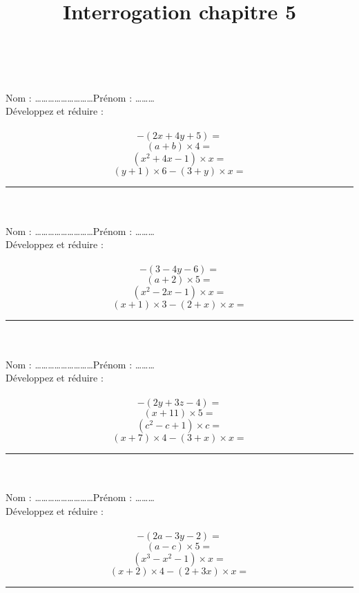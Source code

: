 \documentclass[14 pt]{extarticle}
\title{Interrogation chapitre 5}
\date{}
\theoremstyle{plain}
\begin{document}
 \ \\ \ \\
 Nom : \ldots\ldots\ldots\ldots\ldots\ldots\ldots\ldots\ldots Prénom : \ldots\ldots\ldots \\ 
Développez et réduire :\\ \ \\ 
 \[ - (2x + 4y +5) =   \] 
 \[ (a + b) \times 4 = \] 
 \[ (x^2 + 4x - 1) \times x = \]
 \[ (y+1)\times 6 - (3 + y) \times x = \]
 
 \hrule
 \ \\ \ \\
 Nom : \ldots\ldots\ldots\ldots\ldots\ldots\ldots\ldots\ldots Prénom : \ldots\ldots\ldots \\ 
Développez et réduire :\\ \ \\ 
 \[ - (3 - 4y - 6) =   \] 
 \[ (a + 2) \times 5 = \] 
 \[ (x^2 - 2x - 1) \times x = \]
 \[ (x+1)\times 3 - (2 + x) \times x = \]
 
 \hrule
 \ \\ \ \\
 Nom : \ldots\ldots\ldots\ldots\ldots\ldots\ldots\ldots\ldots Prénom : \ldots\ldots\ldots \\ 
Développez et réduire :\\ \ \\ 
 \[ - (2y + 3z -4) =   \] 
 \[ (x + 11) \times 5 = \] 
 \[ (c^2 - c + 1) \times c = \]
 \[ (x+7)\times 4 - (3 + x) \times x = \]
 
 \hrule
 \ \\ \ \\
 Nom : \ldots\ldots\ldots\ldots\ldots\ldots\ldots\ldots\ldots Prénom : \ldots\ldots\ldots \\ 
Développez et réduire :\\ \ \\ 
 \[ - (2a - 3y -2) =   \] 
 \[ (a - c) \times 5 = \] 
 \[ (x^3 - x^2 - 1) \times x = \]
 \[ (x+2)\times 4 - (2 + 3x) \times x = \]
 
 \hrule
 
 
 
 	
\end{document}
